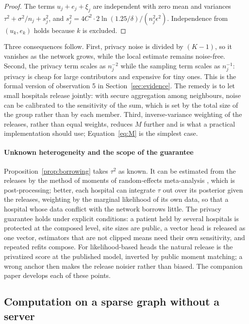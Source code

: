 \documentclass[acmsmall,screen,review]{acmart}
\theoremstyle{acmdefinition}
\begin{document}
\begin{proof}
The terms $u_j+e_j+\xi_j$ are independent with zero mean and variances $\tau^2+\sigma^2/n_j+s_j^2$, and $s_j^2=4C^2\cdot 2\ln(1.25/\delta)/(n_j^2\epsilon^2)$. Independence from $(u_k,e_k)$ holds because $k$ is excluded.
\end{proof}

Three consequences follow. First, privacy noise is divided by $(K-1)$, so it vanishes as the network grows, while the local estimate remains noise-free. Second, the privacy term scales as $n_j^{-2}$ while the sampling term scales as $n_j^{-1}$: privacy is cheap for large contributors and expensive for tiny ones. This is the formal version of observation 5 in Section~\ref{sec:evidence}. The remedy is to let small hospitals release jointly: with secure aggregation \cite{bonawitz2017practical} among neighbours, noise can be calibrated to the sensitivity of the sum, which is set by the total size of the group rather than by each member. Third, inverse-variance weighting of the releases, rather than equal weights, reduces $M$ further and is what a practical implementation should use; Equation~\eqref{eq:M} is the simplest case.

\paragraph{Unknown heterogeneity and the scope of the guarantee} Proposition~\ref{prop:borrowing} takes $\tau^2$ as known. It can be estimated from the releases by the method of moments of random-effects meta-analysis \cite{dersimonian1986meta}, which is post-processing; better, each hospital can integrate $\tau$ out over its posterior given the releases, weighting by the marginal likelihood of its own data, so that a hospital whose data conflict with the network borrows little. The privacy guarantee holds under explicit conditions: a patient held by several hospitals is protected at the composed level, site sizes are public, a vector head is released as one vector, estimators that are not clipped means need their own sensitivity, and repeated refits compose. For likelihood-based heads the natural release is the privatized score at the published model, inverted by public moment matching; a wrong anchor then makes the release noisier rather than biased. The companion paper \cite{simoes2026ghb} develops each of these points.

\subsection{Computation on a sparse graph without a server}\label{sec:S8_4}
\end{document}
